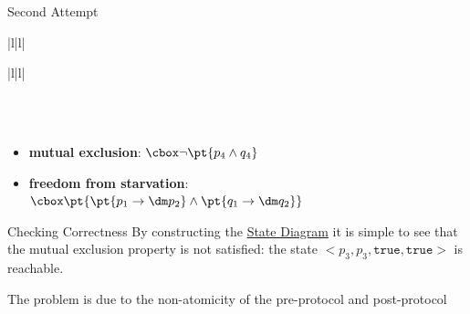 \begin{remark}{Second Attempt}{}
\begin{ctable}{|l|l|}
{\begin{ntable}{|l|l|}
                \hline
            \end{ntable}
        } \\
         \\
        \hline
    \end{ctable}
    \begin{itemize}
        \item \textbf{mutual exclusion}: $\cbox\neg\pt{p_4\wedge q_4}$
        \item \textbf{freedom from starvation}: $\cbox\pt{\pt{p_1\to\dm p_2} \wedge \pt{q_1\to\dm q_2}}$
    \end{itemize}
    \begin{outerproof}{Checking Correctness}{}
        By constructing the \hyperref[def:state-diagram]{State Diagram} it is simple to see that the mutual exclusion property is not satisfied: the state $<p_3,p_3,\texttt{true}, \texttt{true}>$ is reachable.
        \begin{note}
            The problem is due to the non-atomicity of the pre-protocol and post-protocol
        \end{note}
        \emptyln{}
    \end{outerproof}
\end{remark}
